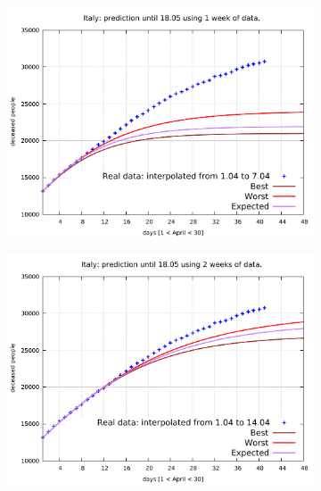 \documentclass[8pt]{article}
\begin{document}
\begin{figure}[h!]
  \centering
  \begin{subfigure}[b]{0.45\linewidth}
  \includegraphics[width=\linewidth]{../tuned/it/1-7/1-7.pdf}
  \end{subfigure}
  \begin{subfigure}[b]{0.45\linewidth}
    \includegraphics[width=\linewidth]{../tuned/it/1-14/1-14.pdf}
  \end{subfigure}
  \begin{subfigure}[b]{0.45\linewidth}

\end{subfigure}
\end{figure}
\end{document}
